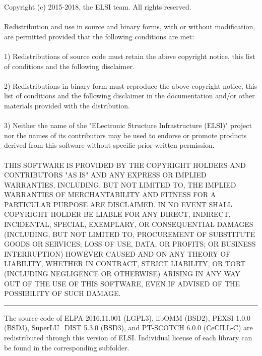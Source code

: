 \documentclass{report}
\begin{document}
Copyright (c) 2015-2018, the ELSI team.  All rights reserved.\\
\\
Redistribution and use in source and binary forms, with or without modification, are permitted provided that the following conditions are met:\\
\\
1) Redistributions of source code must retain the above copyright notice, this list of conditions and the following disclaimer.\\
\\
2) Redistributions in binary form must reproduce the above copyright notice, this list of conditions and the following disclaimer in the documentation and/or other materials provided with the distribution.\\
\\
3) Neither the name of the "ELectronic Structure Infrastructure (ELSI)" project nor the names of its contributors may be used to endorse or promote products derived from this software without specific prior written permission.\\
\\
THIS SOFTWARE IS PROVIDED BY THE COPYRIGHT HOLDERS AND CONTRIBUTORS "AS IS" AND ANY EXPRESS OR IMPLIED WARRANTIES, INCLUDING, BUT NOT LIMITED TO, THE IMPLIED WARRANTIES OF MERCHANTABILITY AND FITNESS FOR A PARTICULAR PURPOSE ARE DISCLAIMED.  IN NO EVENT SHALL COPYRIGHT HOLDER BE LIABLE FOR ANY DIRECT, INDIRECT, INCIDENTAL, SPECIAL, EXEMPLARY, OR CONSEQUENTIAL DAMAGES (INCLUDING, BUT NOT LIMITED TO, PROCUREMENT OF SUBSTITUTE GOODS OR SERVICES; LOSS OF USE, DATA, OR PROFITS; OR BUSINESS INTERRUPTION) HOWEVER CAUSED AND ON ANY THEORY OF LIABILITY, WHETHER IN CONTRACT, STRICT LIABILITY, OR TORT (INCLUDING NEGLIGENCE OR OTHERWISE) ARISING IN ANY WAY OUT OF THE USE OF THIS SOFTWARE, EVEN IF ADVISED OF THE POSSIBILITY OF SUCH DAMAGE.\\
\bigskip
\bigskip
\noindent\rule{18cm}{0.4pt}

The source code of ELPA 2016.11.001 (LGPL3), libOMM (BSD2), PEXSI 1.0.0 (BSD3), SuperLU\_DIST 5.3.0 (BSD3), and PT-SCOTCH 6.0.0 (CeCILL-C) are redistributed through this version of ELSI.  Individual license of each library can be found in the corresponding subfolder.\\
\end{document}
